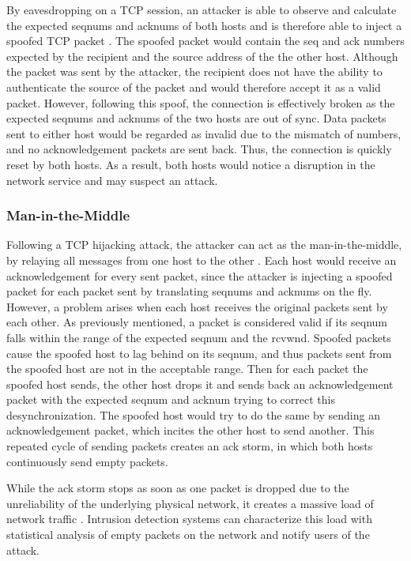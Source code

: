 \documentclass{sig-alternate}
\begin{document}
By eavesdropping on a TCP session, an attacker is able to observe and calculate the expected seqnums and acknums of both hosts and is therefore able to inject a spoofed TCP packet \cite{harris:tcpattacks}.
The spoofed packet would contain the seq and ack numbers expected by the recipient and the source address of the the other host.
Although the packet was sent by the attacker, the recipient does not have the ability to authenticate the source of the packet and would therefore accept it as a valid packet.
However, following this spoof, the connection is effectively broken as the expected seqnums and acknums of the two hosts are out of sync.
Data packets sent to either host would be regarded as invalid due to the mismatch of numbers, and no acknowledgement packets are sent back.
Thus, the connection is quickly reset by both hosts. As a result, both hosts would notice a disruption in the network service and may suspect an attack.

\subsubsection{Man-in-the-Middle}

Following a TCP hijacking attack, the attacker can act as the man-in-the-middle, by relaying all messages from one host to the other \cite{joncheray:simpleattack, gregg:stackhack}.
Each host would receive an acknowledgement for every sent packet, since the attacker is injecting a spoofed packet for each packet sent by translating seqnums and acknums on the fly.
However, a problem arises when each host receives the original packets sent by each other.
As previously mentioned, a packet is considered valid if its seqnum falls within the range of the expected seqnum and the rcvwnd.
Spoofed packets cause the spoofed host to lag behind on its seqnum, and thus packets sent from the spoofed host are not in the acceptable range.
Then for each packet the spoofed host sends, the other host drops it and sends back an acknowledgement packet with the expected seqnum and acknum trying to correct this desynchronization.
The spoofed host would try to do the same by sending an acknowledgement packet, which incites the other host to send another.
This repeated cycle of sending packets creates an ack storm, in which both hosts continuously send empty packets.

While the ack storm stops as soon as one packet is dropped due to the unreliability of the underlying physical network, it creates a massive load of network traffic \cite{joncheray:simpleattack}.
Intrusion detection systems can characterize this load with statistical analysis of empty packets on the network and notify users of the attack.
\end{document}
